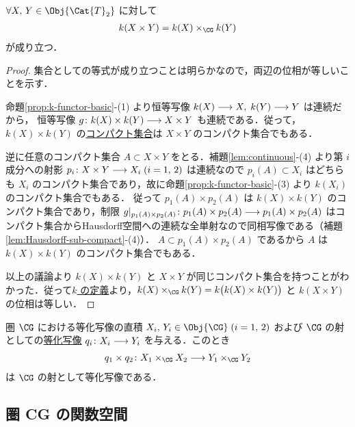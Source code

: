 \documentclass[algtopo_main]{subfiles}
\begin{document}
\begin{mylem}[label=lem:CG-prod]{}
    $\forall X,\, Y \in \Obj{\Cat{T}_2}$ に対して
    \begin{align}
        k(X \times Y) = k(X) \times_{\CG} k(Y)
    \end{align}
    が成り立つ．
\end{mylem}

\begin{proof}
    集合としての等式が成り立つことは明らかなので，両辺の位相が等しいことを示す．

    命題\ref{prop:k-functor-basic}-(1) より恒等写像 $k(X) \longrightarrow X,\; k(Y) \longrightarrow Y$ は連続だから，
    恒等写像 $g \colon k(X) \times k(Y) \longrightarrow X \times Y$ も連続である．従って，$k(X) \times k(Y)$ の\hyperref[def:compact]{コンパクト集合}は $X \times Y$ のコンパクト集合でもある．

    逆に任意のコンパクト集合 $A \subset X \times Y$ をとる．補題\ref{lem:continuous}-(4) より第 $i$ 成分への射影 $p_i \colon X \times Y \longrightarrow X_i\; (i=1,\, 2)$ は連続なので $p_i(A) \subset X_i$ はどちらも $X_i$ のコンパクト集合であり，故に命題\ref{prop:k-functor-basic}-(3) より $k(X_i)$ のコンパクト集合でもある．
    従って $p_1(A) \times p_2(A)$ は $k(X) \times k(Y)$ のコンパクト集合であり，制限 $g|_{p_1(A) \times p_2(A)} \colon p_1(A) \times p_2(A) \longrightarrow p_1(A) \times p_2(A)$ はコンパクト集合からHausdorff空間への連続な全単射なので同相写像である（補題\ref{lem:Hausdorff-sub-compact}-(4)）．
    $A \subset p_1(A) \times p_2(A)$ であるから $A$ は $k(X) \times k(Y)$ のコンパクト集合でもある．

    以上の議論より $k(X) \times k(Y)$ と $X \times Y$ が同じコンパクト集合を持つことがわかった．従って\hyperref[def:k-functor]{$k$ の定義}より，$k(X) \times_{\CG} k(Y) = k \bigl( k(X) \times k(Y) \bigr)$ と $k(X \times Y)$ の位相は等しい．
\end{proof}

\begin{myprop}[label=prop:CG-prod-quotient]{圏 $\CG$ における等化写像の直積}
    $X_i,\, Y_i \in \Obj{\CG}\; (i=1,\, 2)$ および $\CG$ の射としての\hyperref[def:quotient-map]{等化写像} $q_i \colon X_i \longrightarrow Y_i$ を与える．このとき
    \begin{align}
        q_1 \times q_2 \colon X_1 \times_{\CG} X_2 \lto Y_1 \times_{\CG} Y_2
    \end{align}
    は $\CG$ の射として等化写像である．
\end{myprop}


\subsection{圏 \textbf{CG} の関数空間}
\end{document}
